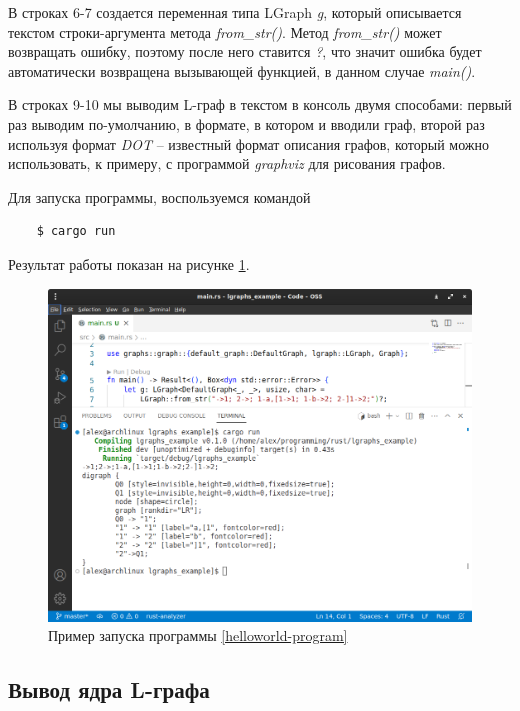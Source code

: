 В строках 6-7 создается переменная типа LGraph \emph{g}, который описывается текстом строки-аргумента
метода \emph{from\_str()}. Метод \emph{from\_str()} может возвращать ошибку, поэтому после него ставится \emph{?}, 
что значит ошибка будет автоматически возвращена вызывающей функцией, в данном случае \emph{main()}.

В строках 9-10 мы выводим L-граф в текстом в консоль двумя способами: первый раз выводим по-умолчанию,
в формате, в котором и вводили граф, второй раз используя формат \emph{DOT} -- известный формат описания графов,
который можно использовать, к примеру, с программой \emph{graphviz} для рисования графов. 

Для запуска программы, воспользуемся командой
\begin{verbatim}
    $ cargo run
\end{verbatim}
Результат работы показан на рисунке \ref{helloworld-out-image}.

\begin{figure}[ht]
    \centering
    \includegraphics[scale=0.4]{static_images/hello_world.png}
    \caption{Пример запуска программы \ref{helloworld-program}}
    \label{helloworld-out-image}
\end{figure}

\subsection{Вывод ядра L-графа}

\inputminted[linenos]{rust}{../lgraphs/examples/core11.rs} \label{core11-program}

